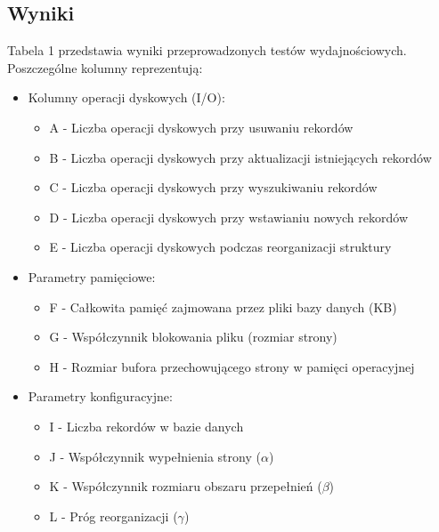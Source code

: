\documentclass[12pt]{article}
\begin{document}
\subsection{Wyniki}
Tabela 1 przedstawia wyniki przeprowadzonych testów wydajnościowych. Poszczególne kolumny reprezentują:

\begin{itemize}
    \item Kolumny operacji dyskowych (I/O):
    \begin{itemize}
        \item A - Liczba operacji dyskowych przy usuwaniu rekordów
        \item B - Liczba operacji dyskowych przy aktualizacji istniejących rekordów
        \item C - Liczba operacji dyskowych przy wyszukiwaniu rekordów
        \item D - Liczba operacji dyskowych przy wstawianiu nowych rekordów
        \item E - Liczba operacji dyskowych podczas reorganizacji struktury
    \end{itemize}
    
    \item Parametry pamięciowe:
    \begin{itemize}
        \item F - Całkowita pamięć zajmowana przez pliki bazy danych (KB)
        \item G - Współczynnik blokowania pliku (rozmiar strony)
        \item H - Rozmiar bufora przechowującego strony w pamięci operacyjnej
    \end{itemize}
    
    \item Parametry konfiguracyjne:
    \begin{itemize}
        \item I - Liczba rekordów w bazie danych
        \item J - Współczynnik wypełnienia strony ($\alpha$)
        \item K - Współczynnik rozmiaru obszaru przepełnień ($\beta$)
        \item L - Próg reorganizacji ($\gamma$)
    \end{itemize}
\end{itemize}
\end{document}
